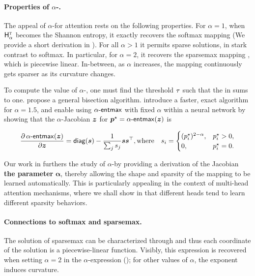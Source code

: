 \paragraph*{Properties of {\boldmath $\alpha$}-\entmaxtext.}
The appeal of $\alpha$-\entmaxtext for attention rests on the
following properties. For $\alpha=1$, \ie when $\mathsf{H}^{{\textsc{t}}}_\alpha$ becomes
the Shannon entropy, it exactly recovers the softmax mapping (We
provide a short derivation in ). For all $\alpha>1$
it permits sparse solutions, in stark contrast to softmax. In
particular, for $\alpha=2$, it recovers the sparsemax mapping
\citep{sparsemax}, which is piecewise linear. In-between, as $\alpha$
increases, the mapping continuously gets sparser as its curvature
changes.

To compute the value of $\alpha$-\entmaxtext, one must find the
threshold $\tau$ such that the \rhs in  sums
to one. \citet{blondel2019learning} propose a general bisection
algorithm. \citet{entmax} introduce a faster, exact algorithm for
$\alpha=1.5$, and enable using $\mathop{\mathsf{\alpha}\textnormal{-}\mathsf{entmax}}$ with fixed $\alpha$ within
a neural network by showing that the $\alpha$-\entmaxtext Jacobian
\wrt $\bm{z}$ for $\bm{p}^\star = \mathop{\mathsf{\alpha}\textnormal{-}\mathsf{entmax}}(\bm{z})$ is

\begin{equation}
    \begin{aligned}
        \frac{\partial \mathop{\mathsf{\alpha}\textnormal{-}\mathsf{entmax}}(\bm{z})}{\partial \bm{z}} = \operatorname*{\mathsf{diag}}(\bm{s}) - \frac{1}{\sum_j s_j} \bm{ss}^\top,
        \text{where}\quad s_i = \begin{cases}(p_i^\star)^{2-\alpha}, & p_i^\star > 0, \\
             0,                        & p_i^\star = 0. \\\end{cases}
    \end{aligned}
\end{equation}

Our work in  furthers the study of
$\alpha$-\entmaxtext by providing a derivation of the Jacobian {\bf
        \wrt the parameter} $\boldsymbol{\alpha}$, thereby allowing the shape
and sparsity of the mapping to be learned automatically. This is
particularly appealing in the context of multi-head attention
mechanisms, where we shall show in  that different
heads tend to learn different sparsity behaviors.

\paragraph*{Connections to softmax and sparsemax.}\label{sec:softmax}
The solution of sparsemax can be characterized through 
and thus each coordinate of the solution is a piecewise-linear function.
Visibly, this expression is recovered when setting $\alpha=2$ in the
$\alpha$-\entmaxtext expression (); for other
values of $\alpha$, the exponent induces curvature.

